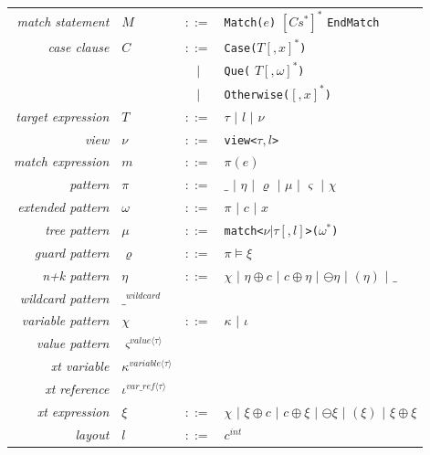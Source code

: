 \documentclass[preprint]{sigplanconf}
\makeatletter
\DeclareRobustCommand{\code}[1]{{\lstinline[breaklines=false,escapechar=@]{#1}}}
\newcommand{\Rule}[1]{{\rmfamily\itshape{#1}}}
\newcommand{\Alt}{\ensuremath{|}}
\newcommand{\is}{$::=$}
\makeatother
\begin{document}
\begin{center}
\begin{tabular}{rp{0em}cl}
\Rule{match statement}     & $M$       & \is{}  & \code{Match(}$e$\code{)} $\left[C s^*\right]^*$ \code{EndMatch} \\
\Rule{case clause}         & $C$       & \is{}  & \code{Case(}$T\left[,x\right]^*$\code{)} \\
                           &           & \Alt{} & \code{Que(} $T\left[,\omega\right]^*$\code{)} \\
                           &           & \Alt{} & \code{Otherwise(}$\left[,x\right]^*$\code{)} \\
\Rule{target expression}   & $T$       & \is{}  & $\tau$ \Alt{} $l$ \Alt{} $\nu$ \\
\Rule{view}                & $\nu$     & \is{}  & \code{view<}$\tau,l$\code{>} \\
\Rule{match expression}    & $m$       & \is{}  & $\pi(e)$ \\
\Rule{pattern}             & $\pi$     & \is{}  & $\_$ \Alt{} $\eta$ \Alt{} $\varrho$ \Alt{} $\mu$ \Alt{} $\varsigma$ \Alt{} $\chi$ \\
\Rule{extended pattern}    & $\omega$  & \is{}  & $\pi$ \Alt{} $c$ \Alt{} $x$ \\
\Rule{tree pattern}        & $\mu$     & \is{}  & \code{match<}$\nu|\tau\left[,l\right]$\code{>(}$\omega^*$\code{)} \\
\Rule{guard pattern}       & $\varrho$ & \is{}  & $\pi \models \xi$ \\
\Rule{n+k pattern}         & $\eta$    & \is{}  & $\chi$ \Alt{} $\eta \oplus c$ \Alt{} $c \oplus \eta$ \Alt{} $\ominus \eta$ \Alt{} $(\eta)$ \Alt{} $\_$ \\
\Rule{wildcard pattern}    & $\_^{wildcard}$ \\
\Rule{variable pattern}    & $\chi$    & \is{}  & $\kappa$ \Alt{} $\iota$ \\
\Rule{value pattern}       & $\varsigma^{value\langle\tau\rangle}$ \\
\Rule{xt variable}         & $\kappa^{variable\langle\tau\rangle}$ \\
\Rule{xt reference}        & $\iota^{var\_ref\langle\tau\rangle}$  \\
\Rule{xt expression}       & $\xi$     & \is{}  & $\chi$ \Alt{} $\xi \oplus c$ \Alt{} $c \oplus \xi$ \Alt{} $\ominus \xi$ \Alt{} $(\xi)$ \Alt{} $\xi \oplus \xi$ \\
\Rule{layout}              & $l$       & \is{}  & $c^{int}$ \\

\end{tabular}
\end{center}
\end{document}
